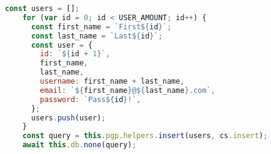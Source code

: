 \begin{lstlisting}[language=JavaScript,caption={Populating Express.js DB},breaklines=true,label={lst:expressSeedDb}]
    const users = [];
    for (var id = 0; id < USER_AMOUNT; id++) {
      const first_name = `First${id}`;
      const last_name = `Last${id}`;
      const user = {
        id: `${id + 1}`,
        first_name,
        last_name,
        username: first_name + last_name,
        email: `${first_name}@${last_name}.com`,
        password: `Pass${id}!`,
      };
      users.push(user);
    }
    const query = this.pgp.helpers.insert(users, cs.insert);
    await this.db.none(query);
\end{lstlisting}

